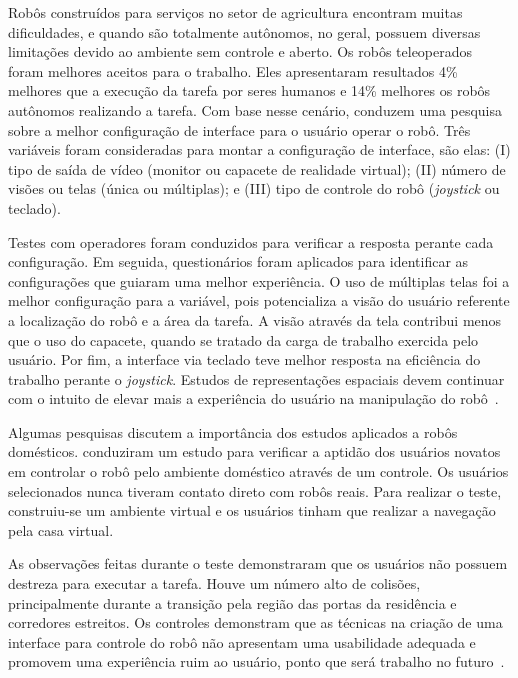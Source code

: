 Robôs construídos para serviços no setor de agricultura encontram muitas dificuldades, e quando são totalmente autônomos, no geral, possuem diversas limitações devido ao ambiente sem controle e aberto. Os robôs teleoperados foram melhores aceitos para o trabalho. Eles apresentaram resultados 4\% melhores que a execução da tarefa por seres humanos e 14\% melhores os robôs autônomos realizando a tarefa. Com base nesse cenário, \textcite{adamides:2017} conduzem uma pesquisa sobre a melhor configuração de interface para o usuário operar o robô. Três variáveis foram consideradas para montar a configuração de interface, são elas: (I) tipo de saída de vídeo (monitor ou capacete de realidade virtual); (II) número de visões ou telas (única ou múltiplas); e (III) tipo de controle do robô (\emph{joystick} ou teclado).

Testes com operadores foram conduzidos para verificar a resposta perante cada configuração. Em seguida, questionários foram aplicados para identificar as configurações que guiaram uma melhor experiência. O uso de múltiplas telas foi a melhor configuração para a variável, pois potencializa a visão do usuário referente a localização do robô e a área da tarefa. A visão através da tela contribui menos que o uso do capacete, quando se tratado da carga de trabalho exercida pelo usuário. Por fim, a interface via teclado teve melhor resposta na eficiência do trabalho perante o \emph{joystick}. Estudos de representações espaciais devem continuar com o intuito de elevar mais a experiência do usuário na manipulação do robô~\cite{adamides:2017}.

Algumas pesquisas discutem a importância dos estudos aplicados a robôs domésticos. \textcite{mcginn:2017} conduziram um estudo para verificar a aptidão dos usuários novatos em controlar o robô pelo ambiente doméstico através de um controle. Os usuários selecionados nunca tiveram contato direto com robôs reais. Para realizar o teste, construiu-se um ambiente virtual e os usuários tinham que realizar a navegação pela casa virtual.

As observações feitas durante o teste demonstraram que os usuários não possuem destreza para executar a tarefa. Houve um número alto de colisões, principalmente durante a transição pela região das portas da residência e corredores estreitos. Os controles demonstram que as técnicas na criação de uma interface para controle do robô não apresentam uma usabilidade adequada e promovem uma experiência ruim ao usuário, ponto que será trabalho no futuro~\cite{mcginn:2017}.


